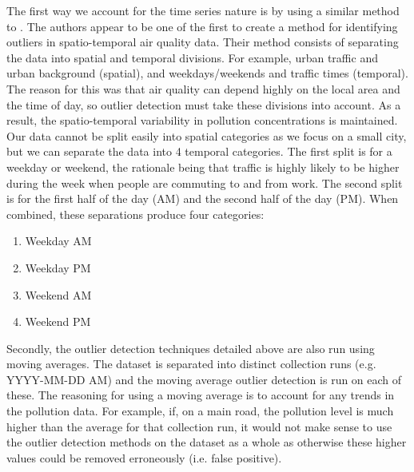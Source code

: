 \documentclass[11pt,twosided,a4paper]{report}
\begin{document}
The first way we account for the time series nature is by using a similar method to \cite{vanZoest2018outlierdetection}. The authors appear to be one of the first to create a method for identifying outliers in spatio-temporal air quality data. Their method consists of separating the data into spatial and temporal divisions. For example, urban traffic and urban background (spatial), and weekdays/weekends and traffic times (temporal). The reason for this was that air quality can depend highly on the local area and the time of day, so outlier detection must take these divisions into account. As a result, the spatio-temporal variability in pollution concentrations is maintained. Our data cannot be split easily into spatial categories as we focus on a small city, but we can separate the data into 4 temporal categories. The first split is for a weekday or weekend, the rationale being that traffic is highly likely to be higher during the week when people are commuting to and from work. The second split is for the first half of the day (AM) and the second half of the day (PM). When combined, these separations produce four categories:
\begin{enumerate}
\item Weekday AM
\item Weekday PM
\item Weekend AM
\item Weekend PM
\end{enumerate}

Secondly, the outlier detection techniques detailed above are also run using moving averages. The dataset is separated into distinct collection runs (e.g. YYYY-MM-DD AM) and the moving average outlier detection is run on each of these. The reasoning for using a moving average is to account for any trends in the pollution data. For example, if, on a main road, the pollution level is much higher than the average for that collection run, it would not make sense to use the outlier detection methods on the dataset as a whole as otherwise these higher values could be removed erroneously (i.e. false positive).

\end{document}
